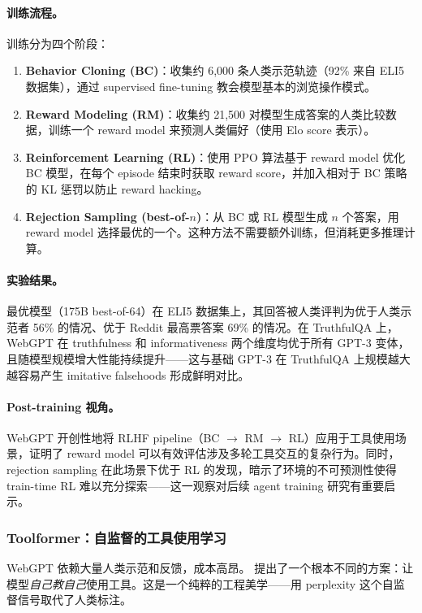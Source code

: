 \paragraph{训练流程。} 训练分为四个阶段：
\begin{enumerate}[leftmargin=*]
  \item \textbf{Behavior Cloning (BC)}：收集约 6,000 条人类示范轨迹（92\% 来自 ELI5 数据集），通过 supervised fine-tuning 教会模型基本的浏览操作模式。
  \item \textbf{Reward Modeling (RM)}：收集约 21,500 对模型生成答案的人类比较数据，训练一个 reward model 来预测人类偏好（使用 Elo score 表示）。
  \item \textbf{Reinforcement Learning (RL)}：使用 PPO 算法基于 reward model 优化 BC 模型，在每个 episode 结束时获取 reward score，并加入相对于 BC 策略的 KL 惩罚以防止 reward hacking。
  \item \textbf{Rejection Sampling (best-of-$n$)}：从 BC 或 RL 模型生成 $n$ 个答案，用 reward model 选择最优的一个。这种方法不需要额外训练，但消耗更多推理计算。
\end{enumerate}

\paragraph{实验结果。} 最优模型（175B best-of-64）在 ELI5 数据集上，其回答被人类评判为优于人类示范者 56\% 的情况、优于 Reddit 最高票答案 69\% 的情况。在 TruthfulQA 上，WebGPT 在 truthfulness 和 informativeness 两个维度均优于所有 GPT-3 变体，且随模型规模增大性能持续提升——这与基础 GPT-3 在 TruthfulQA 上规模越大越容易产生 imitative falsehoods 形成鲜明对比。

\paragraph{Post-training 视角。} WebGPT 开创性地将 RLHF pipeline（BC $\rightarrow$ RM $\rightarrow$ RL）应用于工具使用场景，证明了 reward model 可以有效评估涉及多轮工具交互的复杂行为。同时，rejection sampling 在此场景下优于 RL 的发现，暗示了环境的不可预测性使得 train-time RL 难以充分探索——这一观察对后续 agent training 研究有重要启示。

\subsubsection{Toolformer：自监督的工具使用学习}

WebGPT 依赖大量人类示范和反馈，成本高昂。 提出了一个根本不同的方案：让模型\emph{自己教自己}使用工具。这是一个纯粹的工程美学——用 perplexity 这个自监督信号取代了人类标注。

